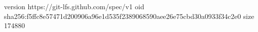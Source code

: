 version https://git-lfs.github.com/spec/v1
oid sha256:f5ffc8e57471d200906a96e1d535f2389068590aee26e75cbd30a0933f34c2e0
size 174880
